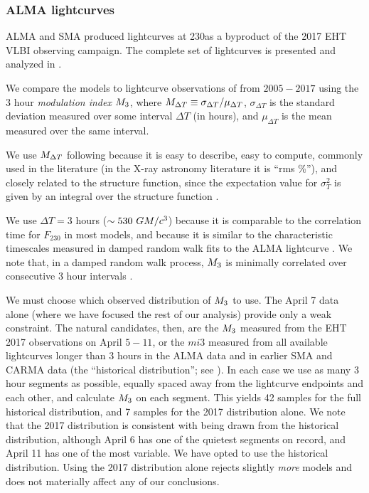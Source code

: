 \subsubsection{ALMA lightcurves}

ALMA and SMA produced \sgra lightcurves at 230\GHz as a byproduct of the 2017 EHT VLBI observing campaign. The complete set of lightcurves is presented and analyzed in \cite{Wielgus2022}.

We compare the models to lightcurve observations of \sgra from $2005-2017$ using the 3 hour {\em modulation index} $M_{3}$, where $M_{\Delta T} \equiv \sigma_{\Delta T}/\mu_{\Delta T}$, $\sigma_{\Delta T}$ is the standard deviation measured over some interval $\Delta T$ (in hours), and $\mu_{\Delta T}$ is the mean measured over the same interval.  

We use $M_{\Delta T}$ following \citet{2015ApJ...812..103C} because it is easy to describe, easy to compute, commonly used in the literature (in the X-ray astronomy literature it is ``rms \%''), and closely related to the structure function, since the expectation value for $\sigma_T^2$ is given by an integral over the structure function \citep[see][]{Lee_2022}.

We use $\Delta T = 3$ hours ($\sim 530~GM/c^3$) because it is comparable to the correlation time for $F_{230}$ in most models, and because it is similar to the characteristic timescales measured in damped random walk fits to the ALMA lightcurve \citep[see Table 10 of][]{Wielgus2022}. We note that, in a damped random walk process, $M_{3}$ is minimally correlated over consecutive 3 hour intervals \citep{Lee_2022}.

We must choose which observed distribution of $M_{3}$ to use.  The April 7 data alone (where we have focused the rest of our analysis) provide only a weak constraint.  The natural candidates, then, are the $M_{3}$ measured from the EHT 2017 observations on April $5-11$, or the $mi{3}$ measured from all available lightcurves longer than 3 hours in the ALMA data and in earlier SMA and CARMA data (the ``historical distribution''; see \citealt{Wielgus2022}).  In each case we use as many 3 hour segments as possible, equally spaced away from the lightcurve endpoints and each other, and calculate $M_{3}$ on each segment.  This yields 42 samples for the full historical distribution, and 7 samples for the 2017 distribution alone.  We note that the 2017 distribution is consistent with being drawn from the historical distribution, although April 6 has one of the quietest segments on record, and April 11 has one of the most variable.  We have opted to use the historical distribution.  Using the 2017 distribution alone rejects slightly {\em more} models and does not materially affect any of our conclusions.


